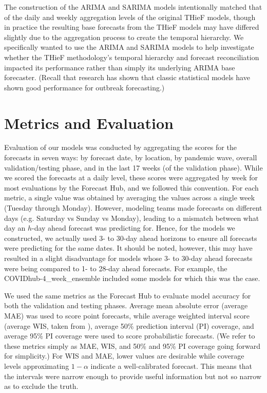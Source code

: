 \documentclass[thesis]{umassthesis}  %
\begin{document}
The construction of the ARIMA and SARIMA models intentionally matched that of the daily and weekly aggregation levels of the original THieF models, though in practice the resulting base forecasts from the THieF models may have differed slightly due to the aggregation process to create the temporal hierarchy. We specifically wanted to use the ARIMA and SARIMA models to help investigate whether the THieF methodology's temporal hierarchy and forecast reconciliation impacted its performance rather than simply its underlying ARIMA base forecaster. (Recall that research has shown that classic statistical models have shown good performance for outbreak forecasting\cite{lauer}.)

\section{Metrics and Evaluation} \label{metrics_and_evaluation}
Evaluation of our models was conducted by aggregating the scores for the forecasts in seven ways: by forecast date, by location, by pandemic wave, overall validation/testing phase, and in the last 17 weeks (of the validation phase). While we scored the forecasts at a daily level, these scores were aggregated by week for most evaluations by the Forecast Hub, and we followed this convention. For each metric, a single value was obtained by averaging the values across a single week (Tuesday through Monday)\cite{eval_reports}. However, modeling teams made forecasts on different days (e.g. Saturday vs Sunday vs Monday), leading to a mismatch between what day an $h$-day ahead forecast was predicting for. Hence, for the models we constructed, we actually used 3- to 30-day ahead horizons to ensure all forecasts were predicting for the same dates. It should be noted, however, this may have resulted in a slight disadvantage for models whose 3- to 30-day ahead forecasts were being compared to 1- to 28-day ahead forecasts. For example, the COVIDhub-4\_week\_ensemble included some models for which this was the case.

We used the same metrics as the Forecast Hub to evaluate model accuracy for both the validation and testing phases. Average mean absolute error (average MAE) was used to score point forecasts, while average weighted interval score (average WIS, taken from \cite{int_eval}), average 50\% prediction interval (PI) coverage, and average 95\% PI coverage were used to score probabilistic forecasts. (We refer to these metrics simply as MAE, WIS, and 50\% and 95\% PI coverage going forward for simplicity.) For WIS and MAE, lower values are desirable while coverage levels approximating $1-\alpha$ indicate a well-calibrated forecast. This means that the intervals were narrow enough to provide useful information but not so narrow as to exclude the truth.
\end{document}
